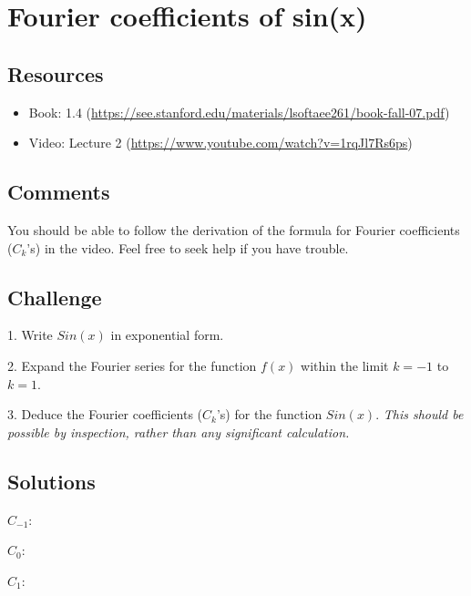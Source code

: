 \timebox




\newpage

\section{Fourier coefficients of sin(x)}
\label{sec:fcsinx}

\subsection*{Resources}
\begin{itemize}
    \item Book: 1.4 (\url{https://see.stanford.edu/materials/lsoftaee261/book-fall-07.pdf})
    \item Video: Lecture 2 (\url{https://www.youtube.com/watch?v=1rqJl7Rs6ps})
\end{itemize}

\subsection*{Comments}
You should be able to follow the derivation of the formula for Fourier coefficients ($C_k$'s) in the video. Feel free to seek help if you have trouble.

\subsection*{Challenge}
1. Write $Sin(x)$ in exponential form.

2. Expand the Fourier series for the function $f(x)$ within the limit $k=-1$ to $k=1$. %

3. Deduce the Fourier coefficients ($C_k$'s) for the function $Sin(x)$. \emph{This should be possible by inspection, rather than any significant calculation.} %

\subsection*{Solutions}
$C_{-1}$: 

$C_{0}$: 

$C_{1}$: 

\timebox




